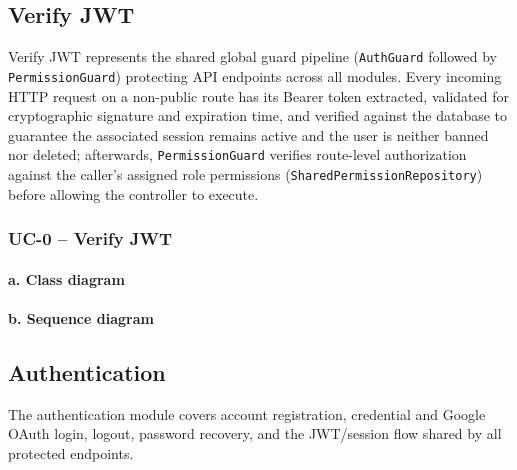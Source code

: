 

\subsection{Verify JWT}

{\sloppy
Verify JWT represents the shared global guard pipeline (\texttt{Auth\allowbreak{}Guard} followed by \texttt{Permission\allowbreak{}Guard}) protecting API endpoints across all modules.
Every incoming HTTP request on a non-public route has its Bearer token extracted, validated for cryptographic
signature and expiration time, and verified against the database to guarantee the associated
session remains active and the user is neither banned nor deleted; afterwards, \texttt{Permission\allowbreak{}Guard} verifies route-level authorization against the caller's assigned role permissions (\texttt{Shared\allowbreak{}Permission\allowbreak{}Repository}) before allowing the controller to execute.\par}

\subsubsection{UC-0 -- Verify JWT}

\paragraph*{a. Class diagram}

\paragraph*{b. Sequence diagram}

\subsection{Authentication}

The authentication module covers account registration, credential and Google OAuth
login, logout, password recovery, and the JWT/session flow shared by all
protected endpoints.

